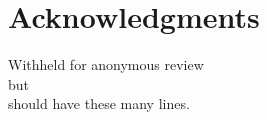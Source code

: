 \documentclass{sig-alternate}
\begin{document}
\section{Acknowledgments}

Withheld for anonymous review \\
but\\
should have these many lines.


%

\end{document}
